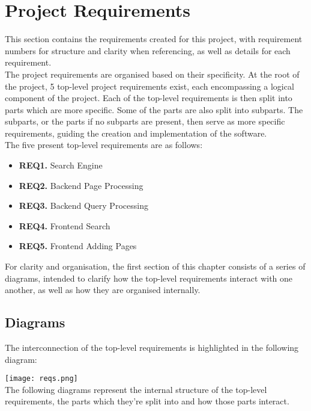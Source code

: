\section{Project Requirements}

This section contains the requirements created for this project, with requirement numbers for structure and clarity when referencing, as well as details for each requirement.\\

The project requirements are organised based on their specificity. At the root of the project, 5 top-level project requirements exist, each encompassing a logical component of the project.
Each of the top-level requirements is then split into parts which are more specific. Some of the parts are also split into subparts. 
The subparts, or the parts if no subparts are present, then serve as more specific requirements, guiding the creation and implementation of the software.\\

The five present top-level requirements are as follows:
\begin{itemize}
    \item \textbf{REQ1.} Search Engine
    \item \textbf{REQ2.} Backend Page Processing
    \item \textbf{REQ3.} Backend Query Processing
    \item \textbf{REQ4.} Frontend Search
    \item \textbf{REQ5.} Frontend Adding Pages
\end{itemize}

For clarity and organisation, the first section of this chapter consists of a series of diagrams, intended to clarify how the top-level requirements interact with one another,
as well as how they are organised internally.

\subsection{Diagrams}

The interconnection of the top-level requirements is highlighted in the following diagram:

\texttt{[image: reqs.png]}\\

The following diagrams represent the internal structure of the top-level requirements, the parts which they're split into and how those parts interact.\\

